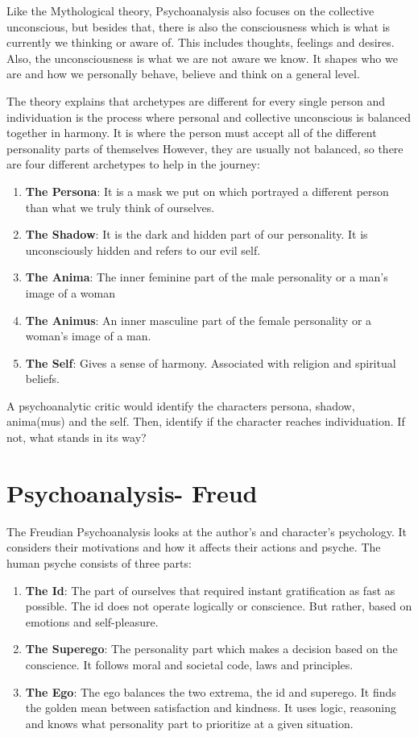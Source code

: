 \documentclass[11pt, twocolumn]{article}
\begin{document}
\begin{twocolumn}
Like the Mythological theory, Psychoanalysis also focuses on the collective unconscious, but besides that, there is also the consciousness which is what is currently we thinking or aware of. This includes thoughts, feelings and desires.
Also, the unconsciousness is what we are not aware we know. It shapes who we are and how we personally behave, believe and think on a general level.

The theory explains that archetypes are different for every single person and individuation is the process where personal and collective unconscious is balanced together in harmony.
It is where the person must accept all of the different personality parts of themselves
However, they are usually not balanced, so there are four different archetypes to help in the journey:
\begin{enumerate}
        \item \textbf{The Persona}: It is a mask we put on which portrayed a different person than what we truly think of ourselves.
        \item \textbf{The Shadow}: It is the dark and hidden part of our personality. It is unconsciously hidden and refers to our evil self.
        \item \textbf{The Anima}: The inner feminine part of the male personality or a man’s image of a woman
        \item \textbf{The Animus}: An inner masculine part of the female personality or a woman’s image of a man.
        \item \textbf{The Self}: Gives a sense of harmony. Associated with religion and spiritual beliefs.
\end{enumerate}

A psychoanalytic critic would identify the characters persona, shadow, anima(mus) and the self. Then, identify if the character reaches individuation. If not, what stands in its way?

\section{Psychoanalysis- Freud}
The Freudian Psychoanalysis looks at the author's and character's psychology. It considers their motivations and how it affects their actions and psyche.
The human psyche consists of three parts:
\begin{enumerate}
        \item \textbf{The Id}: The part of ourselves that required instant gratification as fast as possible. The id does not operate logically or conscience. But rather, based on emotions and self-pleasure.
        \item \textbf{The Superego}: The personality part which makes a decision based on the conscience. It follows moral and societal code, laws and principles.
        \item \textbf{The Ego}: The ego balances the two extrema, the id and superego. It finds the golden mean between satisfaction and kindness. It uses logic, reasoning and knows what personality part to prioritize at a given situation.
\end{enumerate}


\end{twocolumn}
\end{document}
